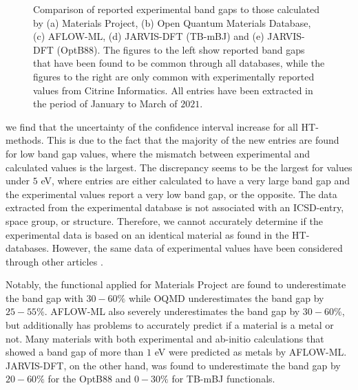 \begin{figure}[t!]\ContinuedFloat
    \centering
    \begin{subfigure}[t]{1\textwidth}
        \centering
        
        \caption{}
    \end{subfigure}%

    \begin{subfigure}[t]{1\textwidth}
        \centering
        
        \caption{}
    \end{subfigure}
    \vspace*{-130mm}
    \caption{Comparison of reported experimental band gaps to those calculated by (a) Materials Project, (b) Open Quantum Materials Database, (c) AFLOW-ML, (d) JARVIS-DFT (TB-mBJ) and (e) JARVIS-DFT (OptB88). The figures to the left show reported band gaps that have been found to be common through all databases, while the figures to the right are only common with experimentally reported values from Citrine Informatics. All entries have been extracted in the period of January to March of $2021$. }
    \label{fig:band gaps}
\end{figure}

\clearpage

\noindent we find that the uncertainty of the confidence interval increase for all HT- methods.
This is due to the fact that the majority of the new entries are found for low band gap values, where the mismatch between experimental and calculated values is the largest.
The discrepancy seems to be the largest for values under $5$ eV, where entries are either calculated to have a very large band gap and the experimental values report a very low band gap, or the opposite.
The data extracted from the experimental database is not associated with an ICSD-entry, space group, or structure. Therefore, we cannot accurately determine if the experimental data is based on an identical material as found in the HT-databases. However, the same data of experimental values have been considered through other articles \cite{Ward2018, Ferrenti2020}.

Notably, the functional applied for Materials Project are found to underestimate the band gap with $30-60\%$ while OQMD underestimates the band gap by $25-55\%$. AFLOW-ML also severely underestimates the band gap by $30-60\%$, but additionally has problems to accurately predict if a material is a metal or not. Many materials with both experimental and ab-initio calculations that showed a band gap of more than $1$ eV were predicted as metals by AFLOW-ML. JARVIS-DFT, on the other hand, was found to underestimate the band gap by $20-60\%$ for the OptB88 and $0-30\%$ for TB-mBJ functionals.



